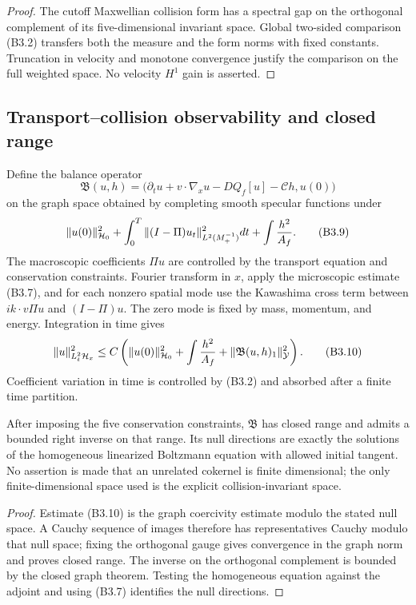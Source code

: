 \begin{proof}
The cutoff Maxwellian collision form has a spectral gap on the orthogonal
complement of its five-dimensional invariant space.  Global two-sided
comparison (B3.2) transfers both the measure and the form norms with fixed
constants.  Truncation in velocity and monotone convergence justify the
comparison on the full weighted space.  No velocity $H^1$ gain is asserted.
\end{proof}

\subsection{Transport--collision observability and closed range}

Define the balance operator
\[
 \mathfrak B(u,h)=
 \bigl(\partial_tu+v\cdot\nabla_xu-DQ_f[u]-\mathcal C h,
       u(0)\bigr)                                        \tag{B3.8}
\]
on the graph space obtained by completing smooth specular functions under
\[
 \|u(0)\|_{\mathcal H_0}^2+
 \int_0^T\|(I-\Pi)u_t\|_{L^2(M_+^{-1})}^2dt+
 \int {h^2\over A_f}.                                   \tag{B3.9}
\]
The macroscopic coefficients $\Pi u$ are controlled by the transport equation
and conservation constraints.  Fourier transform in $x$, apply the
microscopic estimate (B3.7), and for each nonzero spatial mode use the
Kawashima cross term between $ik\cdot v\Pi u$ and $(I-\Pi)u$.  The zero mode is
fixed by mass, momentum, and energy.  Integration in time gives
\[
 \|u\|_{L^2_t\mathcal H_x}^2
 \le C\left(\|u(0)\|_{\mathcal H_0}^2+
            \int {h^2\over A_f}+
            \|\mathfrak B(u,h)_1\|_{\mathcal Y}^2\right).              \tag{B3.10}
\]
Coefficient variation in time is controlled by (B3.2) and absorbed after a
finite time partition.

\begin{theorem}
\label{thm:r23-b3-range}
After imposing the five conservation constraints, $\mathfrak B$ has closed
range and admits a bounded right inverse on that range.  Its null directions
are exactly the solutions of the homogeneous linearized Boltzmann equation
with allowed initial tangent.  No assertion is made that an unrelated
cokernel is finite dimensional; the only finite-dimensional space used is the
explicit collision-invariant space.
\end{theorem}

\begin{proof}
Estimate (B3.10) is the graph coercivity estimate modulo the stated null
space.  A Cauchy sequence of images therefore has representatives Cauchy
modulo that null space; fixing the orthogonal gauge gives convergence in the
graph norm and proves closed range.  The inverse on the orthogonal complement
is bounded by the closed graph theorem.  Testing the homogeneous equation
against the adjoint and using (B3.7) identifies the null directions.
\end{proof}

